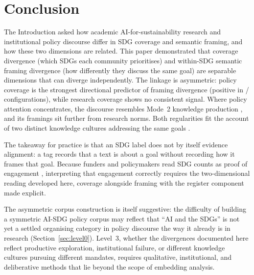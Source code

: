 \documentclass[12pt,a4paper]{article}
\let\OldSection\section
\renewcommand{\section}{\clearpage\FloatBarrier\OldSection}
\begin{document}
\section{Conclusion}
\label{sec:conclusion}

 The Introduction asked how academic AI-for-sustainability research and institutional policy discourse differ in SDG coverage and semantic framing, and how these two dimensions are related. This paper demonstrated that coverage divergence (which SDGs each community prioritises) and within-SDG semantic framing divergence (how differently they discuss the same goal) are separable dimensions that can diverge independently. The linkage is asymmetric: policy coverage is the strongest directional predictor of framing divergence (positive in \HOneDPolicyAdjPositiveCount/\HOneDPolicyAdjPositiveCountTotal{} configurations), while research coverage shows no consistent signal. Where policy attention concentrates, the discourse resembles Mode~2 knowledge production \parencite{Gibbons1994}, and its framings sit further from research norms. Both regularities fit the account of two distinct knowledge cultures addressing the same goals \parencite{Caplan1979, Cash2003}.

The takeaway for practice is that an SDG label does not by itself evidence alignment: a tag records that a text is about a goal without recording how it frames that goal. Because funders and policymakers read SDG counts as proof of engagement \parencite{Heilinger2023, HerasSaizarbitoria2022}, interpreting that engagement correctly requires the two-dimensional reading developed here, coverage alongside framing with the register component made explicit.

 The asymmetric corpus construction is itself suggestive: the difficulty of building a symmetric AI-SDG policy corpus may reflect that ``AI and the SDGs'' is not yet a settled organising category in policy discourse the way it already is in research (Section~\ref{sec:level0}). Level~3, whether the divergences documented here reflect productive exploration, institutional failure, or different knowledge cultures pursuing different mandates, requires qualitative, institutional, and deliberative methods that lie beyond the scope of embedding analysis.

\newrefcontext[sorting=nyt]
\clearpage
\printbibliography[title={Reference list}]



\clearpage
\clearpage
\appendix
\end{document}
